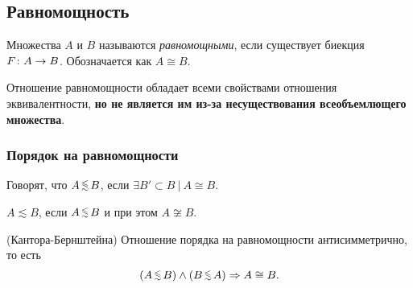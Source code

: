 \subsection{Равномощность}

\begin{definition}
	Множества $A$ и $B$ называются \textit{равномощными}, если существует биекция $F \colon  A \rightarrow B$.
	Обозначается как $A \cong B$.
\end{definition}

\begin{note}
	Отношение равномощности обладает всеми свойствами отношения эквивалентности, \textbf{но не является им из-за несуществования всеобъемлющего множества}.
\end{note}

\subsubsection*{Порядок на равномощности}

\begin{definition}
	Говорят, что $A \leqsim B$, если $\exists B' \subset B\ |\ A \cong B$.
\end{definition}

\begin{definition}
	$A \lesssim B$, если $A \leqsim B$ и при этом $A \not\cong B$.
\end{definition}

\begin{theorem} (Кантора-Бернштейна)
	Отношение порядка на равномощности антисимметрично, то есть
	$$
		(A \leqsim B) \wedge (B \leqsim A) \Ra A \cong B.
	$$
\end{theorem}